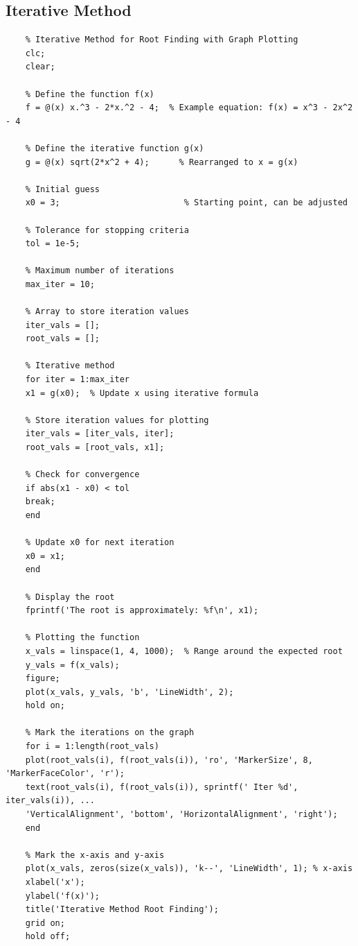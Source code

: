 \documentclass[12pt,a4paper]{article}
\begin{document}
\subsection{Iterative Method}
\begin{verbatim}
	% Iterative Method for Root Finding with Graph Plotting
	clc;
	clear;
	
	% Define the function f(x)
	f = @(x) x.^3 - 2*x.^2 - 4;  % Example equation: f(x) = x^3 - 2x^2 - 4
	
	% Define the iterative function g(x)
	g = @(x) sqrt(2*x^2 + 4);      % Rearranged to x = g(x)
	
	% Initial guess
	x0 = 3;                         % Starting point, can be adjusted
	
	% Tolerance for stopping criteria
	tol = 1e-5;
	
	% Maximum number of iterations
	max_iter = 10;
	
	% Array to store iteration values
	iter_vals = [];
	root_vals = [];
	
	% Iterative method
	for iter = 1:max_iter
	x1 = g(x0);  % Update x using iterative formula
	
	% Store iteration values for plotting
	iter_vals = [iter_vals, iter];
	root_vals = [root_vals, x1];
	
	% Check for convergence
	if abs(x1 - x0) < tol
	break;
	end
	
	% Update x0 for next iteration
	x0 = x1;
	end
	
	% Display the root
	fprintf('The root is approximately: %f\n', x1);
	
	% Plotting the function
	x_vals = linspace(1, 4, 1000);  % Range around the expected root
	y_vals = f(x_vals);
	figure;
	plot(x_vals, y_vals, 'b', 'LineWidth', 2);
	hold on;
	
	% Mark the iterations on the graph
	for i = 1:length(root_vals)
	plot(root_vals(i), f(root_vals(i)), 'ro', 'MarkerSize', 8, 'MarkerFaceColor', 'r');
	text(root_vals(i), f(root_vals(i)), sprintf(' Iter %d', iter_vals(i)), ...
	'VerticalAlignment', 'bottom', 'HorizontalAlignment', 'right');
	end
	
	% Mark the x-axis and y-axis
	plot(x_vals, zeros(size(x_vals)), 'k--', 'LineWidth', 1); % x-axis
	xlabel('x');
	ylabel('f(x)');
	title('Iterative Method Root Finding');
	grid on;
	hold off;
	

\end{verbatim}
\end{document}
